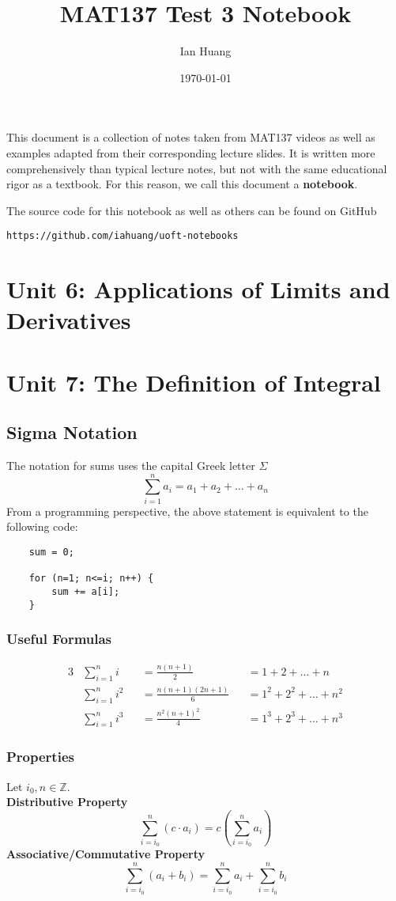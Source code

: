 \documentclass[10pt]{article}
\title{MAT137 Test 3 Notebook}
\author{Ian Huang}
\date{\today}
\def\Z{{\mathbb Z}}
\newenvironment{definition}[1][]{\begin{tcolorbox}[colframe=_orange,colback=_orange2,title=Definition. \ifthenelse{\isempty{#1}}{}{(#1)}
]}{\end{tcolorbox}}
\newcommand{\emptyline}[0]{\\\hfill$~$\\}
\begin{document}
\maketitle
\vfill
\begin{definition}
    This document is a collection of notes taken from MAT137 videos as well as examples adapted from their corresponding lecture slides. It is written more comprehensively than typical lecture notes, but not with the same educational rigor as a textbook. For this reason, we call this document a \textbf{notebook}.
\end{definition}
The source code for this notebook as well as others can be found on GitHub
\begin{center}
    \texttt{https://github.com/iahuang/uoft-notebooks}
\end{center}
\tableofcontents
\newpage
\section{Unit 6: Applications of Limits and Derivatives}
\section{Unit 7: The Definition of Integral}
\subsection{Sigma Notation}
The notation for sums uses the capital Greek letter $\Sigma$
$$
    \sum_{i=1}^n a_i=a_1+a_2+\dots+a_n
$$
From a programming perspective, the above statement is equivalent to the following code:
\begin{verbatim}
    sum = 0;
    
    for (n=1; n<=i; n++) {
        sum += a[i];
    }
\end{verbatim}
\subsubsection{Useful Formulas}

\begin{alignat*}{3}
     & \sum_{i=1}^n i   &  & =\frac{n(n+1)}{2}       &  & =1+2+\dots+n       \\
     & \sum_{i=1}^n i^2 &  & =\frac{n(n+1)(2n+1)}{6} &  & =1^2+2^2+\dots+n^2 \\
     & \sum_{i=1}^n i^3 &  & =\frac{n^2(n+1)^2}{4}   &  & =1^3+2^3+\dots+n^3
\end{alignat*}
\subsubsection{Properties}
Let $i_0,n\in\Z$. \emptyline
\textbf{Distributive Property}
$$
    \sum_{i=i_0}^n(c\cdot a_i)=c\left(\sum_{i=i_0}^n a_i\right)
$$
\textbf{Associative/Commutative Property}
$$
    \sum_{i=i_0}^n(a_i+b_i)=\sum_{i=i_0}^na_i+\sum_{i=i_0}^nb_i
$$
\end{document}
